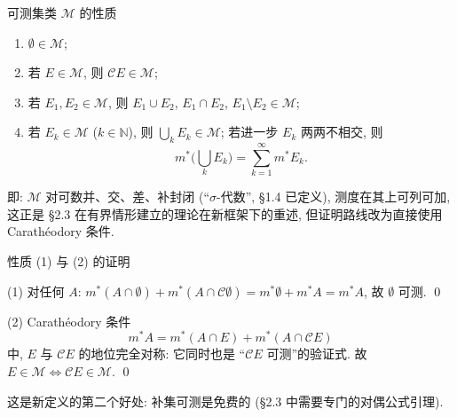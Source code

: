 \begin{frame}{可测集类 $\mathscr{M}$ 的性质}

\begin{thm}[可测集的性质]
\begin{enumerate}
\item $\emptyset \in \mathscr{M}$;
\item 若 $E \in \mathscr{M}$, 则 $\mathscr{C}E \in \mathscr{M}$;
\item 若 $E_1, E_2 \in \mathscr{M}$, 则 $E_1 \cup E_2$, $E_1 \cap E_2$, $E_1 \setminus E_2 \in \mathscr{M}$;
\item 若 $E_k \in \mathscr{M}$ ($k \in \mathbb{N}$), 则 $\bigcup_{k} E_k \in \mathscr{M}$; 若进一步 $E_k$ 两两不相交, 则
\[
m^*\Big(\bigcup_{k} E_k\Big) = \sum_{k=1}^{\infty} m^* E_k .
\]
\end{enumerate}
\end{thm}

\pause

\begin{remark}
即: $\mathscr{M}$ 对\alert{可数}并、交、差、补封闭 (``$\sigma$-代数'', §1.4 已定义), 测度在其上\alert{可列可加}, 这正是 §2.3 在有界情形建立的理论在新框架下的重述, 但证明路线改为\alert{直接使用 Carath\'{e}odory 条件}.
\end{remark}

\end{frame}


\begin{frame}{性质 (1) 与 (2) 的证明}

\startproof[bg=yellow, fg=red](1)
对任何 $A$: $m^*(A \cap \emptyset) + m^*(A \cap \mathscr{C}\emptyset) = m^*\emptyset + m^*A = m^*A$, 故 $\emptyset$ 可测.
\qed

\pause

\startproof[bg=yellow, fg=red](2)
Carath\'{e}odory 条件
\[
m^* A = m^* (A \cap E) + m^* (A \cap \mathscr{C}E)
\]
中, $E$ 与 $\mathscr{C}E$ 的地位\alert{完全对称}: 它同时也是 ``$\mathscr{C}E$ 可测''的验证式. 故 $E \in \mathscr{M} \iff \mathscr{C}E \in \mathscr{M}$.
\qed

\pause

\begin{remark}
这是新定义的第二个好处: \alert{补集可测是免费的} (§2.3 中需要专门的对偶公式引理).
\end{remark}

\end{frame}

